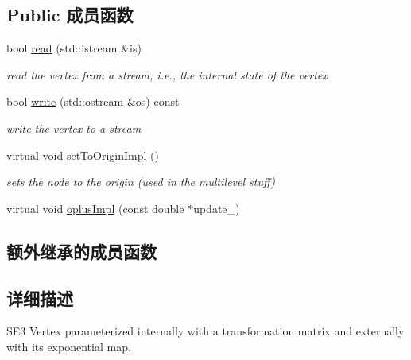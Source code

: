 \subsection*{Public 成员函数}
\begin{DoxyCompactItemize}
\item 
\hypertarget{classg2o_1_1VertexSE3Expmap_a4f5913373d24ea5963fffc6830406a52}{bool \hyperlink{classg2o_1_1VertexSE3Expmap_a4f5913373d24ea5963fffc6830406a52}{read} (std\-::istream \&is)}\label{classg2o_1_1VertexSE3Expmap_a4f5913373d24ea5963fffc6830406a52}

\begin{DoxyCompactList}\small\item\em read the vertex from a stream, i.\-e., the internal state of the vertex \end{DoxyCompactList}\item 
\hypertarget{classg2o_1_1VertexSE3Expmap_a0a4a06afd69669c50cf5f66c5a013e83}{bool \hyperlink{classg2o_1_1VertexSE3Expmap_a0a4a06afd69669c50cf5f66c5a013e83}{write} (std\-::ostream \&os) const }\label{classg2o_1_1VertexSE3Expmap_a0a4a06afd69669c50cf5f66c5a013e83}

\begin{DoxyCompactList}\small\item\em write the vertex to a stream \end{DoxyCompactList}\item 
\hypertarget{classg2o_1_1VertexSE3Expmap_a0d12948c1fb058698bc58177db3806b1}{virtual void \hyperlink{classg2o_1_1VertexSE3Expmap_a0d12948c1fb058698bc58177db3806b1}{set\-To\-Origin\-Impl} ()}\label{classg2o_1_1VertexSE3Expmap_a0d12948c1fb058698bc58177db3806b1}

\begin{DoxyCompactList}\small\item\em sets the node to the origin (used in the multilevel stuff) \end{DoxyCompactList}\item 
virtual void \hyperlink{classg2o_1_1VertexSE3Expmap_a52592993e7ab5de6fe4bb0f9e00c4d39}{oplus\-Impl} (const double $\ast$update\-\_\-)
\end{DoxyCompactItemize}
\subsection*{额外继承的成员函数}


\subsection{详细描述}
S\-E3 Vertex parameterized internally with a transformation matrix and externally with its exponential map. 


